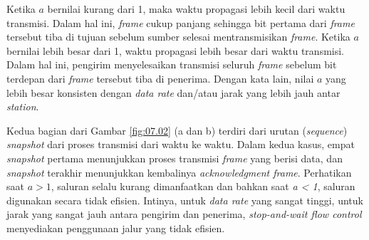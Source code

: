 Ketika $ a $ bernilai kurang dari 1, maka waktu propagasi lebih kecil dari waktu transmisi. Dalam hal ini, \textit{frame} cukup panjang sehingga bit pertama dari \textit{frame} tersebut tiba di tujuan sebelum sumber selesai mentransmisikan \textit{frame}. Ketika $ a $ bernilai lebih besar dari 1, waktu propagasi lebih besar dari waktu transmisi. Dalam hal ini, pengirim menyelesaikan transmisi seluruh \textit{frame} sebelum bit terdepan dari \textit{frame} tersebut tiba di penerima. Dengan kata lain, nilai $ a $ yang lebih besar konsisten dengan \textit{data rate} dan/atau jarak yang lebih jauh antar \textit{station}.

Kedua bagian dari Gambar \ref{fig:07.02} (a dan b) terdiri dari urutan (\textit{sequence}) \textit{snapshot} dari proses transmisi dari waktu ke waktu. Dalam kedua kasus, empat \textit{snapshot} pertama menunjukkan proses transmisi \textit{frame} yang berisi data, dan \textit{snapshot} terakhir menunjukkan kembalinya \textit{acknowledgment frame}. Perhatikan saat $ a > 1 $, saluran selalu kurang dimanfaatkan dan bahkan saat \textit{a < 1}, saluran digunakan secara tidak efisien. Intinya, untuk \textit{data rate} yang sangat tinggi, untuk jarak yang sangat jauh antara pengirim dan penerima, \textit{stop-and-wait flow control} menyediakan penggunaan jalur yang tidak efisien. 

